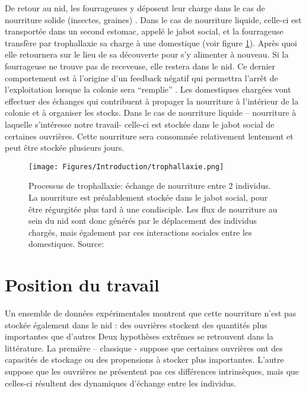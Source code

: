 De retour au nid, les fourrageuses y déposent leur charge dans le cas de nourriture solide (insectes, graines) \citep{reyes-lopez_food_2002}. Dans le cas de nourriture liquide, celle-ci est transportée dans un second estomac, appelé le jabot social, et la fourrageuse transfère par trophallaxie sa charge à une domestique (voir figure \ref{trophallaxie}). Après quoi elle retournera sur le lieu de sa découverte pour s'y alimenter à nouveau. Si la fourrageuse ne trouve pas de receveuse, elle restera dans le nid. Ce dernier comportement est à l'origine d'un feedback négatif qui permettra l'arrêt de l'exploitation lorsque la colonie sera ``remplie'' \citep{mailleux_impact_2010}. Les domestiques chargées vont effectuer des échanges qui contribuent à propager la nourriture à l'intérieur de la colonie et à organiser les stocks. Dans le cas de nourriture liquide – nourriture à laquelle s'intéresse notre travail- celle-ci est stockée dans le jabot social de certaines ouvrières. Cette nourriture sera consommée relativement lentement et peut être stockée plusieurs jours. \\

\begin{figure}[h]
\centering
\texttt{[image: Figures/Introduction/trophallaxie.png]}
\caption{Processus de trophallaxie: échange de nourriture entre 2 individus. La nourriture est préalablement stockée dans le jabot social, pour être régurgitée plus tard à une condisciple. Les flux de nourriture au sein du nid sont donc générés par le déplacement des individus chargés, mais également par ces interactions sociales entre les domestiques.  Source: \citep{holldobler_ants_1990}}
\label{trophallaxie}
\end{figure}


\section{Position du travail}

Un ensemble de données expérimentales montrent que cette nourriture n'est pas stockée également dans le nid : des ouvrières stockent des quantités plus importantes que d'autres \citep{buffin_feeding_2009,buffin_collective_2012} Deux hypothèses extrêmes se retrouvent dans la littérature. La première – classique - suppose que certaines ouvrières ont des capacités de stockage ou des propensions à stocker plus importantes. L'autre suppose que les ouvrières ne présentent pas ces différences intrinsèques, mais que celles-ci résultent des dynamiques d'échange entre les individus.\\


